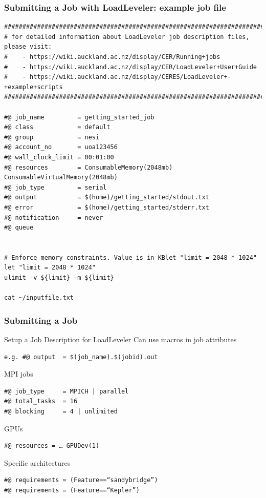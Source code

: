\documentclass{beamer}
\begin{document}
\begin{frame}
  \frametitle{Submitting a Job with LoadLeveler: example job file}
\begin{verbatim}
##########################################################################################
# for detailed information about LoadLeveler job description files, please visit:
#    - https://wiki.auckland.ac.nz/display/CER/Running+jobs
#    - https://wiki.auckland.ac.nz/display/CER/LoadLeveler+User+Guide
#    - https://wiki.auckland.ac.nz/display/CERES/LoadLeveler+-+example+scripts
##########################################################################################
 
#@ job_name         = getting_started_job
#@ class            = default
#@ group            = nesi
#@ account_no       = uoa123456
#@ wall_clock_limit = 00:01:00
#@ resources        = ConsumableMemory(2048mb) ConsumableVirtualMemory(2048mb)
#@ job_type         = serial
#@ output           = $(home)/getting_started/stdout.txt
#@ error            = $(home)/getting_started/stderr.txt
#@ notification     = never
#@ queue
 
 
# Enforce memory constraints. Value is in KBlet "limit = 2048 * 1024"
let "limit = 2048 * 1024"
ulimit -v ${limit} -m ${limit}
 
cat ~/inputfile.txt
\end{verbatim}
\end{frame}


\begin{frame}
  \frametitle{Submitting a Job }
\begin{block}{Setup a Job Description for LoadLeveler}
Can use macros in job attributes
\begin{verbatim}
e.g. #@ output  = $(job_name).$(jobid).out
\end{verbatim}
MPI jobs
\begin{verbatim}
#@ job_type     = MPICH | parallel
#@ total_tasks  = 16
#@ blocking     = 4 | unlimited
\end{verbatim}

GPUs
\begin{verbatim}
#@ resources = … GPUDev(1)
\end{verbatim}

Specific architectures
\begin{verbatim}
#@ requirements = (Feature==“sandybridge”)
#@ requirements = (Feature==“Kepler”)
\end{verbatim}
  \end{block}
\end{frame}
\end{document}
